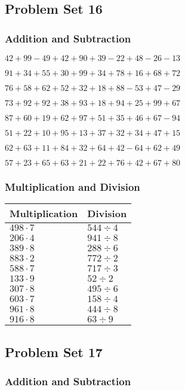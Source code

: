 \hypertarget{problem-set-16}{%
\subsection{Problem Set 16}\label{problem-set-16}}

\hypertarget{addition-and-subtraction-15}{%
\subsubsection{Addition and
Subtraction}\label{addition-and-subtraction-15}}

\(42+99-49+42+90+39-22+48-26-13\)

\(91+34+55+30+99+34+78+16+68+72\)

\(76+58+62+52+32+18+88-53+47-29\)

\(73+92+92+38+93+18+94+25+99+67\)

\(87+60+19+62+97+51+35+46+67-94\)

\(51+22+10+95+13+37+32+34+47+15\)

\(62+63+11+84+32+64+42-64+62+49\)

\(57+23+65+63+21+22+76+42+67+80\)

\hypertarget{multiplication-and-division-15}{%
\subsubsection{Multiplication and
Division}\label{multiplication-and-division-15}}

\begin{longtable}[]{@{}ll@{}}
\toprule
Multiplication & Division\tabularnewline
\midrule
\endhead
\(498\cdot7\) & \(544÷4\)\tabularnewline
\(206\cdot4\) & \(941÷8\)\tabularnewline
\(389\cdot8\) & \(288÷6\)\tabularnewline
\(883\cdot2\) & \(772÷2\)\tabularnewline
\(588\cdot7\) & \(717÷3\)\tabularnewline
\(133\cdot9\) & \(52÷2\)\tabularnewline
\(307\cdot8\) & \(495÷6\)\tabularnewline
\(603\cdot7\) & \(158÷4\)\tabularnewline
\(961\cdot8\) & \(444÷8\)\tabularnewline
\(916\cdot8\) & \(63÷9\)\tabularnewline
\bottomrule
\end{longtable}

\hypertarget{problem-set-17}{%
\subsection{Problem Set 17}\label{problem-set-17}}

\hypertarget{addition-and-subtraction-16}{%
\subsubsection{Addition and
Subtraction}\label{addition-and-subtraction-16}}

